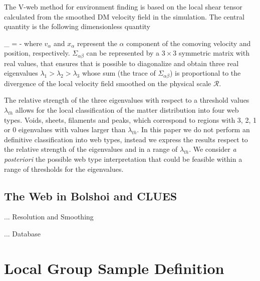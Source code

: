 \documentclass[usenatbib]{latex/mn2e}
\begin{document}
The V-web method for environment finding is based on the local shear 
tensor calculated from the smoothed DM velocity field in the simulation.
The central quantity is the following dimensionless quantity 


{
\Sigma_{\alpha\beta} = -
}
where $v_{\alpha}$ and $x_{\alpha}$ represent the $\alpha$ component of 
the comoving velocity and position, respectively. $\Sigma_{\alpha\beta}$ 
can be represented by a $3\times 3$ symmetric matrix with real values,
that ensures that is possible to diagonalize and obtain three real 
eigenvalues $\lambda_{1} > \lambda_{2}>\lambda_3$ whose sum (the trace of
$\Sigma_{\alpha\beta}$) is proportional to the divergence of the local 
velocity field smoothed on the physical scale ${\mathcal R}$. 


The relative strength of the three eigenvalues with respect to a threshold
values $\lambda_{th}$ allows for the local classification of the matter 
distribution into four web types. Voids, sheets, filaments and peaks, 
which correspond to regions with 3, 2, 1 or 0 eigenvalues with values 
larger than $\lambda_{th}$. In this paper we do not perform an definitive 
classification into web types, instead we express the results respect to 
the relative strength of the eigenvalues and in a range of $\lambda_{th}$.
We consider \textit{a posteriori} the possible web type interpretation 
that could be feasible within a range of thresholds for the eigenvalues. 


\subsection{The Web in Bolshoi and CLUES}
\label{subsec:web_in_simulations}
... Resolution and Smoothing

... Database


\section{Local Group Sample Definition}
\label{section:Def_Samples}
\end{document}
